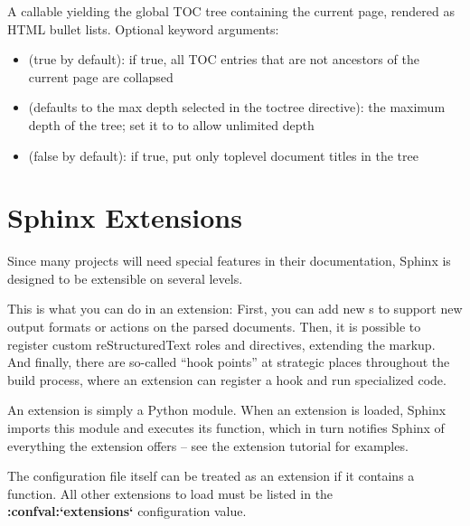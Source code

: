 \documentclass[letterpaper,10pt,english]{sphinxmanual}
\begin{document}
\begin{fulllineitems}
\label{templating:toctree}
A callable yielding the global TOC tree containing the current page, rendered
as HTML bullet lists.  Optional keyword arguments:
\begin{itemize}
\item {} 
 (true by default): if true, all TOC entries that are not
ancestors of the current page are collapsed

\item {} 
 (defaults to the max depth selected in the toctree directive):
the maximum depth of the tree; set it to  to allow unlimited depth

\item {} 
 (false by default): if true, put only toplevel document
titles in the tree

\end{itemize}

\end{fulllineitems}



\chapter{Sphinx Extensions}
\label{extensions::doc}\label{extensions:sphinx-extensions}\label{extensions:module-sphinx.application}\label{extensions:extensions}
Since many projects will need special features in their documentation, Sphinx is
designed to be extensible on several levels.

This is what you can do in an extension: First, you can add new
{\hyperref[glossary:term\string-builder]{}}s to support new output formats or actions on the parsed
documents.  Then, it is possible to register custom reStructuredText roles and
directives, extending the markup.  And finally, there are so-called ``hook
points'' at strategic places throughout the build process, where an extension can
register a hook and run specialized code.

An extension is simply a Python module.  When an extension is loaded, Sphinx
imports this module and executes its  function, which in turn
notifies Sphinx of everything the extension offers -- see the extension tutorial
for examples.

The configuration file itself can be treated as an extension if it contains a
 function.  All other extensions to load must be listed in the
{\color{red}\bfseries{}:confval:{}`extensions{}`} configuration value.
\end{document}

